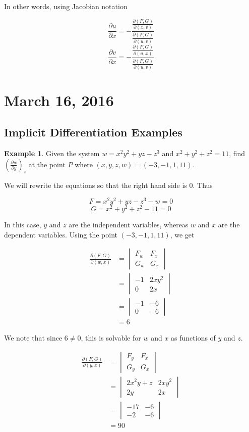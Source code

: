 \documentclass[11pt]{article}
\theoremstyle{plain} %
\theoremstyle{definition}
\theoremstyle{example}
\newtheorem*{example}{Example}
\theoremstyle{remark}
\begin{document}
	In other words, using Jacobian notation
	
	$$\frac{\partial u}{\partial x} = -\frac{\frac{\partial (F,G)}{\partial (x,v)}}{\frac{\partial (F,G)}{\partial (u,v)}}$$
	$$\frac{\partial v}{\partial x} = -\frac{\frac{\partial (F,G)}{\partial (u,x)}}{\frac{\partial (F,G)}{\partial (u,v)}}$$
	
\section{March 16, 2016}
\subsection{Implicit Differentiation Examples}

\begin{example}
Given the system $w=x^2y^2+yz-z^3$ and $x^2+y^2+z^2=11$, find $\left(\frac{\partial w}{\partial y}\right)_z$ at the point $P$ where $(x, y, z, w) = (-3, -1, 1, 11)$. 
\end{example}

We will rewrite the equations so that the right hand side is 0. Thus

$$F = x^2y^2+yz-z^3-w=0$$
$$G = x^2+y^2+z^2-11=0$$

In this case, $y$ and $z$ are the independent variables, whereas $w$ and $x$ are the dependent variables. Using the point $(-3, -1, 1, 11)$, we get

\begin{align*}
\frac{\partial (F,G)}{\partial (w, x)} &= \begin{vmatrix}
		F_w & F_x\\
		G_w & G_x
		\end{vmatrix}\\
		&= \begin{vmatrix}
		-1 & 2xy^2\\
		0 & 2x
		\end{vmatrix}\\
		&= \begin{vmatrix}
		-1 & -6\\
		0 & -6
		\end{vmatrix}\\
	&= 6
\end{align*}

We note that since $6 \neq 0$, this is solvable for $w$ and $x$ as functions of $y$ and $ z$. 

\begin{align*}
\frac{\partial (F,G)}{\partial (y, x)} &= \begin{vmatrix}
		F_y & F_x\\
		G_y & G_x
		\end{vmatrix}\\
		&= \begin{vmatrix}
		2x^2y+z & 2xy^2\\
		2y & 2x
		\end{vmatrix}\\
		&= \begin{vmatrix}
		-17 & -6\\
		-2 & -6
		\end{vmatrix}\\
	&= 90
\end{align*}
\end{document}
